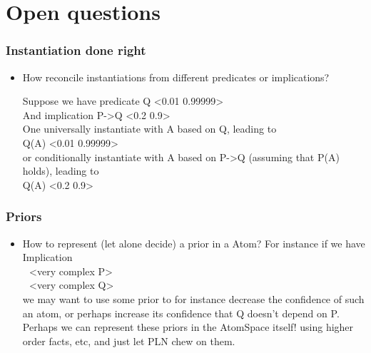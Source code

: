 \documentclass{beamer}
\begin{document}
\fi

\section{Open questions}

\frame
{
  \frametitle{Instantiation done right}

  \begin{itemize}
  \item  How reconcile instantiations from different predicates or
    implications?
    
    Suppose we have predicate Q <0.01 0.99999>\\[.2cm]
    
    And implication P->Q <0.2 0.9>\\[.2cm]
  
    One universally instantiate with A based on Q, leading to\\
    
    Q(A) <0.01 0.99999>\\[.2cm]
    
    or conditionally instantiate with A based on P->Q (assuming that
    P(A) holds), leading to\\[.2cm]
    
    Q(A) <0.2 0.9>\\[.2cm]

  \end{itemize}

}

\frame
{
  \frametitle{Priors}

  \begin{itemize}
    \item How to represent (let alone decide) a prior in a Atom? For
      instance if we have\\[0.2cm]

      Implication\\
      $\ \ \ $<very complex P>\\
      $\ \ \ $<very complex Q>\\[.2cm]
      
      we may want to use some prior to for instance \alert{decrease}
      the confidence of such an atom, or perhaps \alert{increase} its
      confidence that Q doesn't depend on P.\\[.2cm]

      Perhaps we can represent these priors in the AtomSpace itself!
      using higher order facts, etc, and just let PLN chew on them.
  \end{itemize}
}
\end{document}
